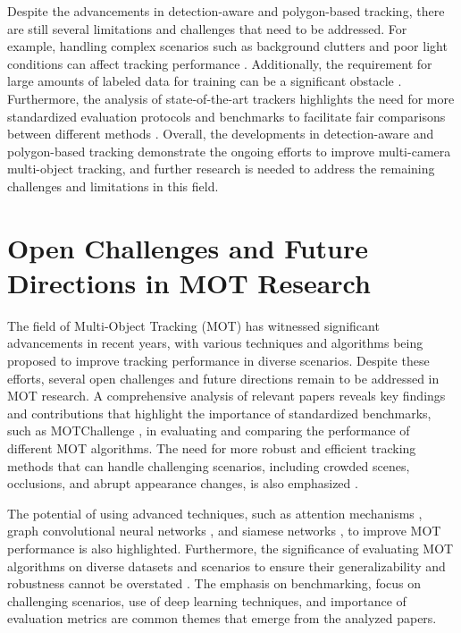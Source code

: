 \documentclass[conference]{IEEEtran}
\begin{document}
Despite the advancements in detection-aware and polygon-based tracking, there are still several limitations and challenges that need to be addressed. For example, handling complex scenarios such as background clutters and poor light conditions can affect tracking performance \cite{Challenge of Multi-Camera Tracking}. Additionally, the requirement for large amounts of labeled data for training can be a significant obstacle \cite{MCTR: Multi Camera Tracking Transformer}. Furthermore, the analysis of state-of-the-art trackers highlights the need for more standardized evaluation protocols and benchmarks to facilitate fair comparisons between different methods \cite{Tracking the Trackers: An Analysis of the State of the Art in Multiple Object Tracking}. Overall, the developments in detection-aware and polygon-based tracking demonstrate the ongoing efforts to improve multi-camera multi-object tracking, and further research is needed to address the remaining challenges and limitations in this field.

\section{Open Challenges and Future Directions in MOT Research}
The field of Multi-Object Tracking (MOT) has witnessed significant advancements in recent years, with various techniques and algorithms being proposed to improve tracking performance in diverse scenarios. Despite these efforts, several open challenges and future directions remain to be addressed in MOT research. A comprehensive analysis of relevant papers reveals key findings and contributions that highlight the importance of standardized benchmarks, such as MOTChallenge \cite{MOTChallenge}, in evaluating and comparing the performance of different MOT algorithms. The need for more robust and efficient tracking methods that can handle challenging scenarios, including crowded scenes, occlusions, and abrupt appearance changes, is also emphasized \cite{DeepLearningforMOT}.

The potential of using advanced techniques, such as attention mechanisms \cite{AttentionMechanisms}, graph convolutional neural networks \cite{GraphConvolutionalNeuralNetworks}, and siamese networks \cite{SiameseNetworks}, to improve MOT performance is also highlighted. Furthermore, the significance of evaluating MOT algorithms on diverse datasets and scenarios to ensure their generalizability and robustness cannot be overstated \cite{EvaluationMetricsforMOT}. The emphasis on benchmarking, focus on challenging scenarios, use of deep learning techniques, and importance of evaluation metrics are common themes that emerge from the analyzed papers.
\end{document}
